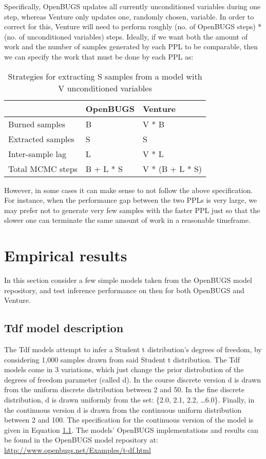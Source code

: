 Specifically, OpenBUGS updates all currently unconditioned variables during one step, whereas Venture only updates one, randomly chosen, variable. In order to correct for this, Venture will need to perform roughly (no. of OpenBUGS steps) * (no. of unconditioned variables) steps. Ideally, if we want both the amount of work and the number of samples generated by each PPL to be comparable, then we can specify the work that must be done by each PPL as:

\begin{table}[H]
  \centering
  \begin{tabular}{lll}
    \toprule
    & OpenBUGS & Venture \\
    \midrule
    Burned samples & B & V * B \\
    Extracted samples & S & S \\
    Inter-sample lag & L & V * L \\
    Total MCMC steps & B + L * S & V * (B + L * S) \\
    \bottomrule
  \end{tabular}
  \caption{Strategies for extracting S samples from a model with V unconditioned variables}
  \label{tab:noSteps}
\end{table}

However, in some cases it can make sense to not follow the above specification. For instance, when the performance gap between the two PPLs is very large, we may prefer not to generate very few samples with the faster PPL just so that the slower one can terminate the same amount of work in a reasonable timeframe. 

\section{Empirical results}
In this section consider a few simple models taken from the OpenBUGS model repository, and test inference performance on then for both OpenBUGS and Venture. 

\subsection{Tdf model description}
The Tdf models attempt to infer a Student t distribution's degrees of freedom, by considering 1,000 samples drawn from said Student t distribution. The Tdf models come in 3 variations, which just change the prior distrobution of the degrees of freedom parameter (called d). In the course discrete version d is drawn from the uniform discrete distribution between 2 and 50. In the fine discrete distribution, d is drawn uniformly from the set: \{2.0, 2.1, 2.2, \ldots 6.0\}. Finally, in the continuous version d is drawn from the continuous uniform distribution between 2 and 100. The specification for the continuous version of the model is given in Equation \ref{}. The models' OpenBUGS implementations and results can be found in the OpenBUGS model repository at: \url{http://www.openbugs.net/Examples/t-df.html}

